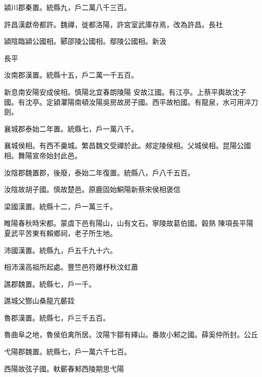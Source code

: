\begin{pinyinscope}
 潁川郡秦置。統縣九，戶二萬八千三百。



 許昌漢獻帝都許。魏禪，徙都洛陽，許宮室武庫存焉，改為許昌。長社



 潁陰臨潁公國相。郾邵陵公國相。鄢陵公國相。新汲



 長平



 汝南郡漢置。統縣十五，戶二萬一千五百。



 新息南安陽安成侯相。慎陽北宜春朗陵陽
 安故江國。有江亭。上蔡平輿故沈子國。有沈亭。定潁灈陽南頓汝陽吳房故房子國。西平故柏國。有龍泉，水可用淬刀劍。



 襄城郡泰始二年置。統縣七，戶一萬八千。



 襄城侯相。有西不羹城。繁昌魏文受禪於此。郟定陵侯相。父城侯相。昆陽公國相。舞陽宣帝始封此邑。



 汝陰郡魏置郡，後廢，泰始二年復置。統縣八，戶八千五百。



 汝陰故胡子國。慎故楚邑。原鹿固始鮦陽新蔡宋侯相褒信



 梁國漢置。統縣十二，戶一萬三千。



 睢陽春秋時宋都。蒙虞下邑有陽山，山有文石。寧陵故葛伯國。穀熟
 陳項長平陽夏武平苦東有賴鄉祠，老子所生地。



 沛國漢置。統縣九，戶五千九十六。



 相沛漢高祖所起處。豐竺邑符離杼秋汶虹蕭



 譙郡魏置。統縣七，戶一千。



 譙城父酂山桑龍亢蘄銍



 魯郡漢置。統縣七，戶三千五百。



 魯曲阜之地，魯侯伯禽所居。汶陽卞鄒有繹山。番故小邾之國。薛奚仲所封。公丘



 弋陽郡魏置。統縣七，戶一萬六千七百。



 西陽故弦子國。軑蘄春邾西陵期思弋陽




\end{pinyinscope}
